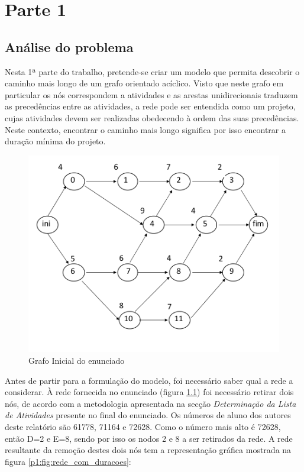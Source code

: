 \chapter{Parte 1}
\label{cap:p1}

\section{Análise do problema}

Nesta 1ª parte do trabalho, pretende-se criar um modelo que permita descobrir
o caminho mais longo de um grafo orientado acíclico. Visto que neste grafo em
particular os nós correspondem a atividades e as arestas unidirecionais traduzem
as precedências entre as atividades, a rede pode ser entendida como um projeto,
cujas atividades devem ser realizadas obedecendo à ordem das suas precedências.
Neste contexto, encontrar o caminho mais longo significa por isso encontrar
a duração mínima do projeto.

\begin{figure}[<+htpb+>]
	\centering
	\includegraphics[scale=0.5]{./img/p1_rede_original}
	\caption{Grafo Inicial do enunciado}
	\label{p1:fig:rede_original}
\end{figure}

Antes de partir para a formulação do modelo, foi necessário saber qual a rede
a considerar. À rede fornecida no enunciado (figura \ref{p1:fig:rede_original}) foi necessário retirar dois nós, de
acordo com a metodologia apresentada na secção \textit{Determinação da Lista de
Atividades} presente no final do enunciado. Os números de aluno dos autores
deste relatório são 61778, 71164 e 72628. Como o número mais alto é 72628, então
D=2 e E=8, sendo por isso os nodos 2 e 8 a ser retirados da rede. A rede
resultante da remoção destes dois nós tem a representação gráfica mostrada na figura \ref{p1:fig:rede_com_duracoes}:

